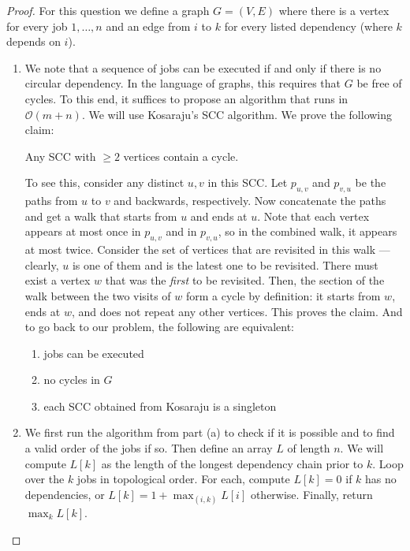 \documentclass{article}
\begin{document}
    \begin{proof}
      For this question we define a graph $G = (V, E)$ where there is a vertex for every job $1, \dots, n$ and an edge from $i$ to $k$ for every listed dependency (where $k$ depends on $i$).

      \begin{enumerate}
          \item We note that a sequence of jobs can be executed if and only if there is no circular dependency. In the language of graphs, this requires that $G$ be free of cycles. To this end, it suffices to propose an algorithm that runs in $\mathcal{O}(m+n)$. We will use Kosaraju's SCC algorithm. We prove the following claim:

          \centerline{Any SCC with $\geqslant 2$ vertices contain a cycle.}
                      \vspace{5pt} 
    
          To see this, consider any distinct $u,v$ in this SCC. Let $p_{u,v}$ and $p_{v,u}$ be the paths from $u$ to $v$ and backwards, respectively. Now concatenate the paths and get a walk that starts from $u$ and ends at $u$. Note that each vertex appears at most once in $p_{u,v}$ and in $p_{v,u}$, so in the combined walk, it appears at most twice. Consider the set of vertices that are revisited in this walk --- clearly, $u$ is one of them and is the latest one to be revisited. There must exist a vertex $w$ that was the \textit{first} to be revisited. Then, the section of the walk between the two visits of $w$ form a cycle by definition: it starts from $w$, ends at $w$, and does not repeat any other vertices. This proves the claim. And to go back to our problem, the following are equivalent: 
          \begin{enumerate}
            \item jobs can be executed 
            \item no cycles in $G$ 
            \item each SCC obtained from Kosaraju is a singleton
          \end{enumerate}

          \item We first run the algorithm from part (a) to check if it is possible and to find a valid order of the jobs if so. Then define an array $L$ of length $n$. We will compute $L[k]$ as the length of the longest dependency chain prior to $k$. Loop over the $k$ jobs in topological order. For each, compute $L[k] = 0$ if $k$ has no dependencies, or $L[k] = 1 + \max_{(i, k)} L[i]$ otherwise. Finally, return $\max_{k} L[k]$. 
      \end{enumerate}
      
    \end{proof}
\end{document}
